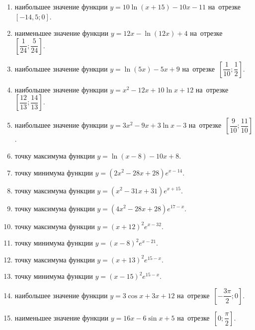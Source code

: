 \documentclass[a4paper,10pt]{article}
\begin{document}
\begin{enumerate}
\item {} наибольшее значение функции $y = 10\ln \left(x+15\right)-10x -11$ на~отрезке~$\left[-14,5;0\right]$.

\item {} наименьшее значение функции $y=12x-\ln \left(12x\right)+4$ на~отрезке~$\left[\dfrac{1}{24};\dfrac{5}{24}\right]$.

\item {} наибольшее значение функции $y=\ln \left(5x\right)-5x+9$ на~отрезке~$\left[\dfrac{1}{10};\dfrac{1}{2}\right]$.

\item {} наибольшее значение функции $y=x^2-12x+10\ln x+12$ на~отрезке~$\left[\dfrac{12}{13};\dfrac{14}{13}\right]$.

\item {} наибольшее значение функции $y=3x^2-9x+3\ln x-3$ на~отрезке~$\left[\dfrac{9}{10};\dfrac{11}{10}\right]$.

\item {} точку максимума функции $y=\ln \left(x-8\right)-10x+8$.

\item {} точку минимума функции $y=\left(2x^2-28x+28\right)e^{x-14}$.

\item {} точку максимума функции $y=\left(x^2-31x+31\right)e^{x+15}$.

\item {} точку максимума функции $y=\left(4x^2-28x+28\right)e^{17-x}$.

\item {} точку максимума функции $y=\left(x +12\right)^2e^{x-32}$.

\item {} точку минимума функции $y=\left(x -8\right)^2e^{x-21}$.

\item {} точку максимума функции $y=\left(x +13\right)^2e^{15-x}$.

\item {} точку минимума функции $y=\left(x -15\right)^2e^{15-x}$.

\item {} наибольшее значение функции $y=3\cos x+3x +12$ на~отрезке~$\left[-\dfrac{3\pi }{2};0\right]$.

\item {} наименьшее значение функции $y=16x-6\sin x +5$ на~отрезке~$\left[0;\dfrac{\pi }{2}\right]$.


\end{enumerate}
\end{document}

